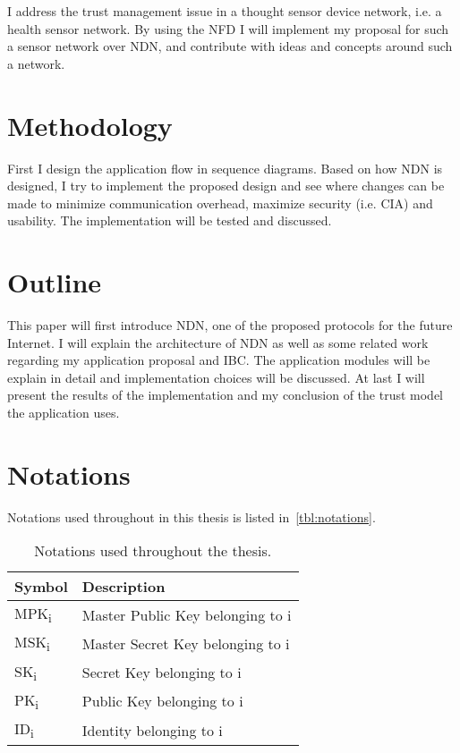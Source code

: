 I address the trust management issue in a thought sensor device network, i.e. a health sensor network.
By using the \gls{NFD} I will implement my proposal for such a sensor network over \gls{NDN}, and contribute with ideas and concepts around such a network.

\section{Methodology}

First I design the application flow in sequence diagrams.
Based on how \gls{NDN} is designed, I try to implement the proposed design and see where changes can be made to minimize communication overhead, maximize security (i.e. \gls{CIA}) and usability.
The implementation will be tested and discussed.

\section{Outline}

This paper will first introduce \gls{NDN}, one of the proposed protocols for the future Internet.
I will explain the architecture of \gls{NDN} as well as some related work regarding my application proposal and \gls{IBC}. 
The application modules will be explain in detail and implementation choices will be discussed.
At last I will present the results of the implementation and my conclusion of the trust model the application uses.

\section{Notations}
Notations used throughout in this thesis is listed in~\autoref{tbl:notations}.
\begin{table}[h]
  \begin{tabular}[c]{p{}p{}}
  \hline
  Symbol                    & Description                           \\ \hline
  MPK\textsubscript{i}      & Master Public Key belonging to i      \\ %
  MSK\textsubscript{i}      & Master Secret Key belonging to i      \\ %
  SK\textsubscript{i}       & Secret Key belonging to i             \\ %
  PK\textsubscript{i}       & Public Key belonging to i             \\ %
  ID\textsubscript{i}       & Identity belonging to i               \\ %
  \end{tabular}
  \caption{Notations used throughout the thesis.}
  \label{tbl:notations}
\end{table}